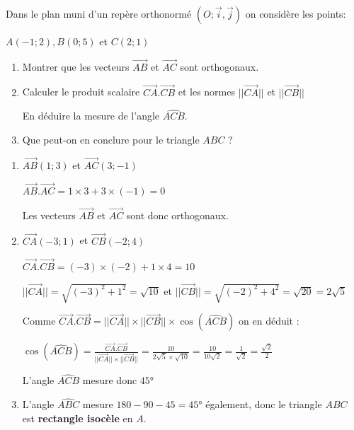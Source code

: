
%
Dans le plan muni d'un repère orthonormé $\left(O ; \vec{i}, \vec{j}\right)$ on considère les points:
\par
$A \left(-1 ; 2\right) , B \left(0 ; 5\right)$ et $C \left(2 ; 1\right)$
\begin{enumerate}
     \item
     Montrer que les vecteurs $\overrightarrow{AB}$ et $\overrightarrow{AC}$ sont orthogonaux.
     \item
     Calculer le produit scalaire $\overrightarrow{CA}.\overrightarrow{CB}$ et les normes $||\overrightarrow{CA}||$ et $||\overrightarrow{CB}||$
     \par
     En déduire la mesure de l'angle $\widehat{ACB}$.
     \item
     Que peut-on en conclure pour le triangle $ABC$ ?
\end{enumerate}
\begin{corrige}
     \begin{enumerate}
          \item
          $\overrightarrow{AB} \left(1 ; 3\right)$ et $\overrightarrow{AC} \left(3 ; -1\right)$
          \par
          $\overrightarrow{AB}.\overrightarrow{AC}=1\times 3+3\times \left(-1\right)=0$
          \par
          Les vecteurs $\overrightarrow{AB}$ et $\overrightarrow{AC}$ sont donc orthogonaux.
          \item
          $\overrightarrow{CA} \left(-3 ; 1\right)$ et $\overrightarrow{CB} \left(-2 ; 4\right)$
          \par
          $\overrightarrow{CA}.\overrightarrow{CB}=\left(-3\right)\times \left(-2\right)+1\times 4=10$
          \par
          $||\overrightarrow{CA}||=\sqrt{\left(-3\right)^{2}+1^{2}}=\sqrt{10}$ et $||\overrightarrow{CB}||=\sqrt{\left(-2\right)^{2}+4^{2}}=\sqrt{20}=2\sqrt{5}$
          \par
          Comme $\overrightarrow{CA}.\overrightarrow{CB}=||\overrightarrow{CA}||\times ||\overrightarrow{CB}||\times \cos\left(\widehat{ACB}\right)$ on en déduit :
          \par
          $\cos\left(\widehat{ACB}\right) = \frac{\overrightarrow{CA}.\overrightarrow{CB}}{||\overrightarrow{CA}||\times ||\overrightarrow{CB}||} = \frac{10}{2\sqrt{5}\times \sqrt{10}}=\frac{10}{10\sqrt{2}}=\frac{1}{\sqrt{2}}=\frac{\sqrt{2}}{2}$
          \par
          L'angle $\widehat{ACB}$ mesure donc $45$°
          \item
          L'angle $\widehat{ABC}$ mesure $180-90-45=45$° également, donc le triangle $ABC$ est \textbf{rectangle isocèle} en $A$.
     \end{enumerate}
\end{corrige}
